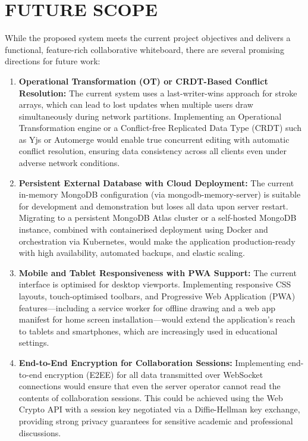 \documentclass[12pt,a4paper]{report}
\begin{document}
\section{FUTURE SCOPE}

While the proposed system meets the current project objectives and delivers a functional, feature-rich collaborative whiteboard, there are several promising directions for future work:

\begin{enumerate}[label=\arabic*.]
  \item \textbf{Operational Transformation (OT) or CRDT-Based Conflict Resolution:} The current system uses a last-writer-wins approach for stroke arrays, which can lead to lost updates when multiple users draw simultaneously during network partitions. Implementing an Operational Transformation engine or a Conflict-free Replicated Data Type (CRDT) such as Yjs or Automerge would enable true concurrent editing with automatic conflict resolution, ensuring data consistency across all clients even under adverse network conditions.

  \item \textbf{Persistent External Database with Cloud Deployment:} The current in-memory MongoDB configuration (via mongodb-memory-server) is suitable for development and demonstration but loses all data upon server restart. Migrating to a persistent MongoDB Atlas cluster or a self-hosted MongoDB instance, combined with containerised deployment using Docker and orchestration via Kubernetes, would make the application production-ready with high availability, automated backups, and elastic scaling.

  \item \textbf{Mobile and Tablet Responsiveness with PWA Support:} The current interface is optimised for desktop viewports. Implementing responsive CSS layouts, touch-optimised toolbars, and Progressive Web Application (PWA) features---including a service worker for offline drawing and a web app manifest for home screen installation---would extend the application's reach to tablets and smartphones, which are increasingly used in educational settings.

  \item \textbf{End-to-End Encryption for Collaboration Sessions:} Implementing end-to-end encryption (E2EE) for all data transmitted over WebSocket connections would ensure that even the server operator cannot read the contents of collaboration sessions. This could be achieved using the Web Crypto API with a session key negotiated via a Diffie-Hellman key exchange, providing strong privacy guarantees for sensitive academic and professional discussions.


\end{enumerate}
\end{document}
